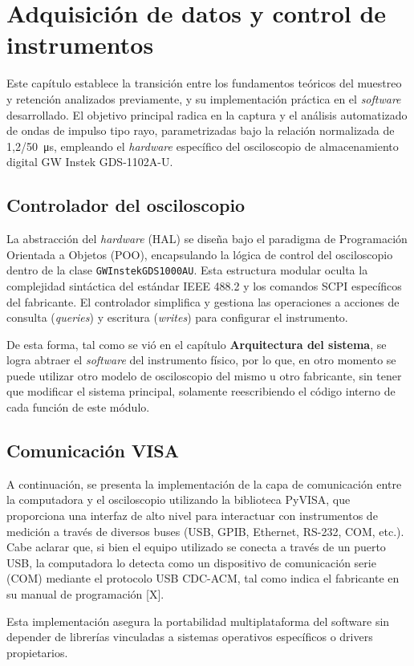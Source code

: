 \newpage
\chapter{Adquisición de datos y control de instrumentos}
\vspace{3\baselineskip}

Este capítulo establece la transición entre los fundamentos teóricos del muestreo y retención analizados previamente, y su implementación práctica en el \textit{software} desarrollado. El objetivo principal radica en la captura y el análisis automatizado de ondas de impulso tipo rayo, parametrizadas bajo la relación normalizada de \SI[parse-numbers=false]{1,2/50}{\micro\second}, empleando el \textit{hardware} específico del osciloscopio de almacenamiento digital GW Instek GDS-1102A-U.

\section{Controlador del osciloscopio}
La abstracción del \textit{hardware} (HAL) se diseña bajo el paradigma de Programación Orientada a Objetos (POO), encapsulando la lógica de control del osciloscopio dentro de la clase \texttt{GWInstekGDS1000AU}. Esta estructura modular oculta la complejidad sintáctica del estándar IEEE 488.2 y los comandos SCPI específicos del fabricante. El controlador simplifica y gestiona las operaciones a acciones de consulta (\textit{queries}) y escritura (\textit{writes}) para configurar el instrumento.\par
De esta forma, tal como se vió en el capítulo \textbf{Arquitectura del sistema}, se logra abtraer el \textit{software} del instrumento físico, por lo que, en otro momento se puede utilizar otro modelo de osciloscopio del mismo u otro fabricante, sin tener que modificar el sistema principal, solamente reescribiendo el código interno de cada función de este módulo.\par

\section{Comunicación VISA}
A continuación, se presenta la implementación de la capa de comunicación entre la computadora y el osciloscopio utilizando la biblioteca PyVISA, que proporciona una interfaz de alto nivel para interactuar con instrumentos de medición a través de diversos buses (USB, GPIB, Ethernet, RS-232, COM, etc.). Cabe aclarar que, si bien el equipo utilizado se conecta a través de un puerto USB, la computadora lo detecta como un dispositivo de comunicación serie (COM) mediante el protocolo USB CDC-ACM, tal como indica el fabricante en su manual de programación [X].\par
Esta implementación asegura la portabilidad multiplataforma del software sin depender de librerías vinculadas a sistemas operativos específicos o drivers propietarios.

